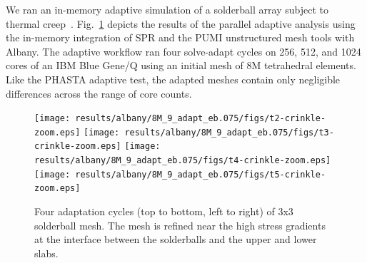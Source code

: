 We ran an in-memory adaptive simulation of a solderball array subject to thermal
creep~\cite{albanyThermalCreep}.
Fig.~\ref{fig:alb-adapt} depicts the results of the parallel adaptive analysis
using the in-memory integration of SPR and the PUMI
unstructured mesh tools with Albany.
The adaptive workflow ran four solve-adapt cycles on 256, 512, and 1024 cores of
an IBM Blue Gene/Q using an initial mesh of 8M tetrahedral elements.
Like the PHASTA adaptive test, the adapted meshes contain only
negligible differences across the range of core counts.

\begin{figure} \centering
  \texttt{[image: results/albany/8M\_9\_adapt\_eb.075/figs/t2-crinkle-zoom.eps]}
  \texttt{[image: results/albany/8M\_9\_adapt\_eb.075/figs/t3-crinkle-zoom.eps]}
  \texttt{[image: results/albany/8M\_9\_adapt\_eb.075/figs/t4-crinkle-zoom.eps]}
  \texttt{[image: results/albany/8M\_9\_adapt\_eb.075/figs/t5-crinkle-zoom.eps]}
  \caption[Four adaptation cycles of 3x3 solderball mesh.]{
    Four adaptation cycles (top to bottom, left to right) of 3x3 solderball
    mesh.
    The mesh is refined near the high stress gradients at the interface between
    the solderballs and the upper and lower slabs.
  }
  \label{fig:alb-adapt}
\end{figure}

